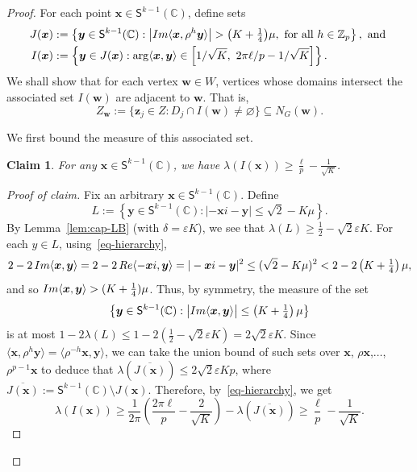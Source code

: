 \documentclass[10pt,a4paper]{article}
\newcommand\innerp[1]{\langle #1 \rangle}
\newenvironment{poc}{\begin{proof}[Proof of claim]\renewcommand*{\qedsymbol}{$\blacksquare$}}{\end{proof}}
\newcommand{\V}[1]{\mathbold{#1}}
\newtheorem{claim}[theorem]{Claim}
\theoremstyle{definition}
\def\eps{{\varepsilon}}
\newcommand{\iminnerp}[1]{{\rm{Im}}\langle #1 \rangle}
\newcommand{\reinnerp}[1]{{\rm{Re}}\langle #1 \rangle}
\newcommand{\sS}{\mathsf{S}}
\newcommand{\sC}{\mathbb{C}}
\newcommand{\sZ}{\mathbb{Z}}
\newcommand*{\bigabs}[1]{\bigl|#1\bigr|}
\begin{document}
\begin{proof}
For each point $\V{x}\in \sS^{k-1}(\sC)$, define sets
\begin{align*}
	J(\V{x})&:=\left\{\V{y}\in \sS^{k-1}(\sC): \bigabs{\iminnerp{\V{x}, \rho^h \V{y}}}>\textstyle{\left(K+\frac{1}{4}\right)}\mu, \text{ for all } h\in \sZ_p\right\},\text{ and }\\
	I(\V{x})&:=\left\{\V{y}\in J(\V{x}): \arg\innerp{\V{x},\V{y}}\in \left[1/\sqrt{K},~2\pi \ell/p-1/\sqrt{K}\right]\right\}.
\end{align*} 
We shall show that for each vertex $\V w\in W$, vertices whose domains intersect the associated set $I(\V w)$ are adjacent to $\V w$. That is, 
\begin{equation}\label{eq:Zw}
	Z_\V{w}:=\{\V{z}_j\in Z: D_j\cap I(\V{w})\neq \varnothing\}\subseteq N_G(\V w).
\end{equation}

We first bound the measure of this associated set.
\begin{claim}\label{lem-crossnbrs}
	For any $\V{x}\in \sS^{k-1}(\sC)$, we have $\lambda(I(\V{x}))\ge \frac{\ell}{p}-\frac{1}{\sqrt{K}}$.
\end{claim}
\begin{poc}
	Fix an arbitrary $\V{x}\in \sS^{k-1}(\sC)$. Define 
	$$L:=\left\{\V{y}\in \sS^{k-1}(\sC): |-\V{x}i-\V{y}|\le\sqrt{2}-K\mu\right\}.$$
	By Lemma~\ref{lem:cap-LB} (with $\delta=\eps K$), we see that $\lambda(L)\ge \frac{1}{2}-\sqrt{2}\eps K$. For each $y\in L$, using~\eqref{eq-hierarchy},
	\begin{equation*}
		2- 2\,\iminnerp{\V{x},\V{y}}=2-2\,\reinnerp{-\V{x}i,\V{y}}=|- \V{x}i-\V{y}|^2\le (\sqrt{2}-K\mu)^2<2-2\left(K+\tfrac{1}{4}\right)\mu,
	\end{equation*}
    and so  $\iminnerp{\V{x},\V{y}}>(K+\frac{1}{4})\mu$. Thus, by symmetry, the measure of the set
	$$
	\left\{\V{y}\in \sS^{k-1}(\sC): \bigabs{\iminnerp{\V{x},\V{y}}}\le\left(K+\tfrac{1}{4}\right)\mu\right\}$$
	is at most $1-2\lambda(L)\le 1-2\left(\frac{1}{2}-\sqrt{2}\eps K\right)=2\sqrt{2}\eps K$.
	Since $\innerp{\V{x},\rho^h\V{y}}=\innerp{\rho^{-h}\V{x},\V{y}}$, we can take the union bound of such sets over $\V{x}$, $\rho\V{x}$,$\ldots$, $\rho^{p-1}\V{x}$ to deduce that $\lambda(\overline{J(\V{x})})\le 2\sqrt{2}\eps Kp$, where $\overline{J(\V{x})}:=\sS^{k-1}(\sC)\setminus J(\V{x})$. Therefore, by~\eqref{eq-hierarchy}, we get
	\begin{equation*}
		\lambda(I(\V{x}))\ge\frac{1}{2\pi}\left(\frac{2\pi\ell}{p}-\frac{2}{\sqrt{K}}\right)-\lambda(\overline{J(\V{x})})\ge \frac{\ell}{p}-\frac{1}{\sqrt{K}}.
	\end{equation*}
\end{poc}



\end{proof}
\end{document}
